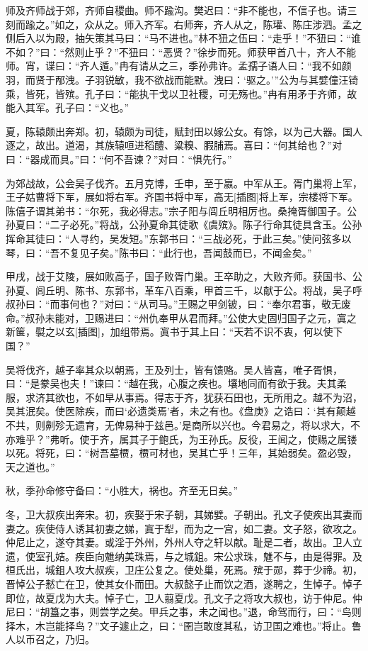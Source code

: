 \documentclass[a4paper,12pt,UTF8,twoside]{ctexbook}
\begin{document}
师及齐师战于郊，齐师自稷曲。师不踰沟。樊迟曰：“非不能也，不信子也。请三刻而踰之。”如之，众从之。师入齐军。右师奔，齐人从之，陈瓘、陈庄涉泗。孟之侧后入以为殿，抽矢策其马曰：“马不进也。”林不狃之伍曰：“走乎！”不狃曰：“谁不如？”曰：“然则止乎？”不狃曰：“恶贤？”徐步而死。师获甲首八十，齐人不能师。宵，谍曰：“齐人遁。”冉有请从之三，季孙弗许。孟孺子语人曰：“我不如颜羽，而贤于邴洩。子羽锐敏，我不欲战而能默。洩曰：‘驱之。’”公为与其嬖僮汪锜乘，皆死，皆殡。孔子曰：“能执干戈以卫社稷，可无殇也。”冉有用矛于齐师，故能入其军。孔子曰：“义也。”

夏，陈辕颇出奔郑。初，辕颇为司徒，赋封田以嫁公女。有馀，以为己大器。国人逐之，故出。道渴，其族辕咺进稻醴、粱糗、腵脯焉。喜曰：“何其给也？”对曰：“器成而具。”曰：“何不吾谏？”对曰：“惧先行。”

为郊战故，公会吴子伐齐。五月克博，壬申，至于嬴。中军从王。胥门巢将上军，王子姑曹将下军，展如将右军。齐国书将中军，高无[插图]将上军，宗楼将下军。陈僖子谓其弟书：“尔死，我必得志。”宗子阳与闾丘明相厉也。桑掩胥御国子。公孙夏曰：“二子必死。”将战，公孙夏命其徒歌《虞殡》。陈子行命其徒具含玉。公孙挥命其徒曰：“人寻约，吴发短。”东郭书曰：“三战必死，于此三矣。”使问弦多以琴，曰：“吾不复见子矣。”陈书曰：“此行也，吾闻鼓而已，不闻金矣。”

甲戌，战于艾陵，展如败高子，国子败胥门巢。王卒助之，大败齐师。获国书、公孙夏、闾丘明、陈书、东郭书，革车八百乘，甲首三千，以献于公。将战，吴子呼叔孙曰：“而事何也？”对曰：“从司马。”王赐之甲剑铍，曰：“奉尔君事，敬无废命。”叔孙未能对，卫赐进曰：“州仇奉甲从君而拜。”公使大史固归国子之元，寘之新箧，褽之以玄[插图]，加组带焉。寘书于其上曰：“天若不识不衷，何以使下国？”

吴将伐齐，越子率其众以朝焉，王及列士，皆有馈赂。吴人皆喜，唯子胥惧，曰：“是豢吴也夫！”谏曰：“越在我，心腹之疾也。壤地同而有欲于我。夫其柔服，求济其欲也，不如早从事焉。得志于齐，犹获石田也，无所用之。越不为沼，吴其泯矣。使医除疾，而曰‘必遗类焉’者，未之有也。《盘庚》之诰曰：‘其有颠越不共，则劓殄无遗育，无俾易种于兹邑。’是商所以兴也。今君易之，将以求大，不亦难乎？”弗听。使于齐，属其子于鲍氏，为王孙氏。反役，王闻之，使赐之属镂以死。将死，曰：“树吾墓槚，槚可材也，吴其亡乎！三年，其始弱矣。盈必毁，天之道也。”

秋，季孙命修守备曰：“小胜大，祸也。齐至无日矣。”

冬，卫大叔疾出奔宋。初，疾娶于宋子朝，其娣嬖。子朝出。孔文子使疾出其妻而妻之。疾使侍人诱其初妻之娣，寘于犁，而为之一宫，如二妻。文子怒，欲攻之。仲尼止之，遂夺其妻。或淫于外州，外州人夺之轩以献。耻是二者，故出。卫人立遗，使室孔姞。疾臣向魋纳美珠焉，与之城鉏。宋公求珠，魋不与，由是得罪。及桓氏出，城鉏人攻大叔疾，卫庄公复之。使处巢，死焉。殡于郧，葬于少禘。初，晋悼公子慭亡在卫，使其女仆而田。大叔懿子止而饮之酒，遂聘之，生悼子。悼子即位，故夏戊为大夫。悼子亡，卫人翦夏戊。孔文子之将攻大叔也，访于仲尼。仲尼曰：“胡簋之事，则尝学之矣。甲兵之事，未之闻也。”退，命驾而行，曰：“鸟则择木，木岂能择鸟？”文子遽止之，曰：“圉岂敢度其私，访卫国之难也。”将止。鲁人以币召之，乃归。
\end{document}
